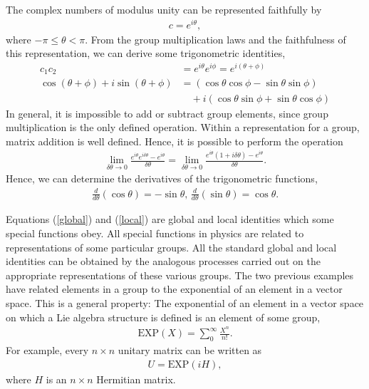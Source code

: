 \documentclass{beamer}
\begin{document}
\begin{frame}
\justify
The complex numbers of modulus unity can be represented faithfully by
\begin{align}
c = e^{i\theta},
\end{align}
where $-\pi \leq \theta < \pi$. From the group multiplication laws and the faithfulness of this representation, we can derive some trigonometric identities,
\begin{align}
c_1 c_2 & = e^{i \theta} e^{i \phi} = e^{i (\theta + \phi)} \label{global} \\
\cos (\theta + \phi) + i \sin(\theta + \phi) & = (\cos\theta \cos\phi - \sin\theta \sin \phi) \nonumber \\ & \quad + i (\cos\theta \sin\phi + \sin\theta \cos\phi)
\end{align}
\vfill
In general, it is impossible to add or subtract group elements, since group multiplication is the only defined operation. Within a representation for a group, matrix addition is well defined. Hence, it is possible to perform the operation
\begin{align}
\lim_{\delta\theta \rightarrow 0} \frac{e^{i\theta}e^{i\delta\theta} - e^{i\theta}}{\delta\theta} = \lim_{\delta\theta \rightarrow 0} \frac{e^{i\theta}(1+i\delta\theta) - e^{i\theta}}{\delta\theta}. \label{local}
\end{align}
\vfill
Hence, we can determine the derivatives of the trigonometric functions,
\begin{align}
\frac{d}{d\theta} (\cos\theta) = -\sin\theta,\, \frac{d}{d\theta} (\sin\theta) = \cos\theta.
\end{align}
\end{frame}

\begin{frame}
\justify
Equations (\ref{global}) and (\ref{local}) are global and local identities which some special functions obey.
\vfill
All special functions in physics are related to representations of some particular groups.
\vfill
All the standard global and local identities can be obtained by the analogous processes carried out on the appropriate representations of these various groups.
\vfill
The two previous examples have related elements in a group to the exponential of an element in a vector space. This is a general property: The exponential of an element in a vector space on which a Lie algebra structure is defined is an element of some group,
\begin{align}
\text{EXP}(X) = \sum_0^\infty \frac{X^n}{n!}.
\end{align}
For example, every $n\times n$ unitary matrix can be written as
\begin{align}
U = \text{EXP} (iH),
\end{align}
where $H$ is an $n\times n$ Hermitian matrix.
\end{frame}
\end{document}
